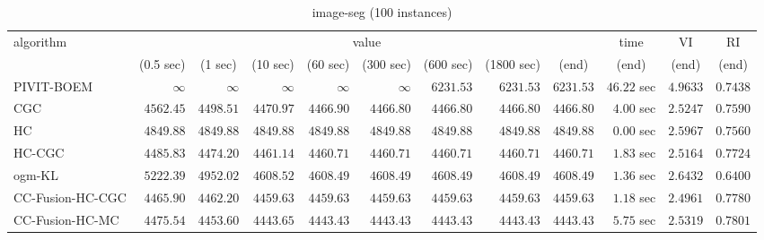 \begin{table}[H]
\scriptsize
\centering
\caption{image-seg (100 instances)}
\label{tab:anytimetable-image-seg}
\begin{tabular}{lrrrrrrrrrrr}
\toprule
           algorithm &                                   \multicolumn{8}{c}{value} & \multicolumn{1}{c}{time}    & \multicolumn{1}{c}{VI}  & \multicolumn{1}{c}{RI} \\  
\cmidrule(lr){2-9}\cmidrule(lr){10-10} \cmidrule(lr){11-11} \cmidrule(lr){12-12}   
                     & \multicolumn{1}{c}{(0.5 sec)} & \multicolumn{1}{c}{(1 sec)} & \multicolumn{1}{c}{(10 sec)} & \multicolumn{1}{c}{(60 sec)} & \multicolumn{1}{c}{(300 sec)} & \multicolumn{1}{c}{(600 sec)} & \multicolumn{1}{c}{(1800 sec)} & \multicolumn{1}{c}{(end)} & \multicolumn{1}{c}{(end)}    & \multicolumn{1}{c}{(end)}   & \multicolumn{1}{c}{(end)}  \\ \midrule 
          PIVIT-BOEM & $\infty$ & $\infty$ & $\infty$ & $\infty$ & $\infty$ & $      6231.53$ & $      6231.53$ & $      6231.53$ & $        46.22$ sec    & $       4.9633$  & $       0.7438$ \\ 
                 CGC & $      4562.45$ & $      4498.51$ & $      4470.97$ & $      4466.90$ & $      4466.80$ & $      4466.80$ & $      4466.80$ & $      4466.80$ & $         4.00$ sec    & $       2.5247$  & $       0.7590$ \\ 
                  HC & $      4849.88$ & $      4849.88$ & $      4849.88$ & $      4849.88$ & $      4849.88$ & $      4849.88$ & $      4849.88$ & $      4849.88$ & $         0.00$ sec    & $       2.5967$  & $       0.7560$ \\ 
              HC-CGC & $      4485.83$ & $      4474.20$ & $      4461.14$ & $      4460.71$ & $      4460.71$ & $      4460.71$ & $      4460.71$ & $      4460.71$ & $         1.83$ sec    & $       2.5164$  & $       0.7724$ \\ 
              ogm-KL & $      5222.39$ & $      4952.02$ & $      4608.52$ & $      4608.49$ & $      4608.49$ & $      4608.49$ & $      4608.49$ & $      4608.49$ & $         1.36$ sec    & $       2.6432$  & $       0.6400$ \\ 
    CC-Fusion-HC-CGC & $      4465.90$ & $      4462.20$ & $      4459.63$ & $      4459.63$ & $      4459.63$ & $      4459.63$ & $      4459.63$ & $      4459.63$ & $         1.18$ sec    & $       2.4961$  & $       0.7780$ \\ 
     CC-Fusion-HC-MC & $      4475.54$ & $      4453.60$ & $      4443.65$ & $      4443.43$ & $      4443.43$ & $      4443.43$ & $      4443.43$ & $      4443.43$ & $         5.75$ sec    & $       2.5319$  & $       0.7801$ \\ 

\end{tabular}
\end{table}
